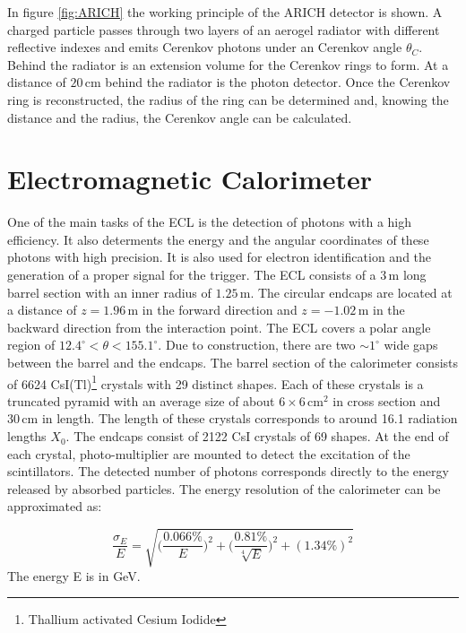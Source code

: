 \documentclass[a4paper,11pt,twosided,final,german,openbib,pdftex,listof=totoc,bibliography=totoc]{scrbook}
\begin{document}
In figure \ref{fig:ARICH} the working principle of the ARICH detector is shown. A charged particle passes through two layers of an aerogel radiator with different reflective indexes and emits Cerenkov photons under an Cerenkov angle $\theta_C$. Behind the radiator is an extension volume for the Cerenkov rings to form. At a distance of $20\,\textrm{cm}$ behind the radiator is the photon detector.\cite{B2TR} Once the Cerenkov ring is reconstructed, the radius of the ring can be determined and, knowing the distance and the radius, the Cerenkov angle can be calculated.

\section{Electromagnetic Calorimeter}
\label{sec:ECL}

One of the main tasks of the ECL is the detection of photons with a high efficiency. It also determents the energy and the angular coordinates of these photons with high precision. It is also used for electron identification and the generation of a proper signal for the trigger. The ECL consists of a $3\,\textrm{m}$ long barrel section with an inner radius of $1.25\,\textrm{m}$. The circular endcaps are located at a distance of $z=1.96\,\textrm{m}$ in the forward direction and $z=-1.02\,\textrm{m}$ in the backward direction from the interaction point. The ECL covers a polar angle region of $12.4^{\circ} < \theta < 155.1^{\circ}$. Due to construction, there are two $ \sim 1^{\circ}$ wide gaps between the barrel and the endcaps. The barrel section of the calorimeter consists of 6624 CsI(Tl)\footnote{Thallium activated Cesium Iodide} crystals with 29 distinct shapes. Each of these crystals is a truncated pyramid with an average size of about $6\times6 \, \textrm{cm}^2$ in cross section and $30\,\textrm{cm}$ in length. The length of these crystals corresponds to around 16.1 radiation lengths $X_0$. The endcaps consist of 2122 CsI crystals of 69 shapes. At the end of each crystal, photo-multiplier are mounted to detect the excitation of the scintillators. The detected number of photons corresponds directly to the energy released by absorbed particles.
The energy resolution of the calorimeter can be approximated as:\cite{B2TR} \cite{Belle_ECL_2015}

\begin{equation}
\frac{\sigma_E}{E} = \sqrt{\bigg(\frac{0.066\%}{E}\bigg)^2 + \bigg(\frac{0.81\%}{\sqrt[4]{E}}\bigg)^2 + (1.34\%)^2}
\end{equation}
The energy E is in GeV.
\newline
\end{document}
